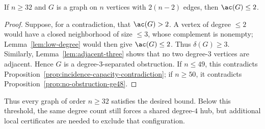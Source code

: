 \begin{theorem}\label{thm:range-ge32}
If \(n\ge32\) and \(G\) is a graph on \(n\) vertices with
\(2(n-2)\) edges, then \(\ac(G)\le2\).
\end{theorem}

\begin{proof}
Suppose, for a contradiction, that \(\ac(G)>2\).  A vertex of degree
\(\le2\) would have a closed neighborhood of size \(\le3\), whose complement
is nonempty; Lemma~\ref{lem:low-degree} would then give \(\ac(G)\le2\).
Thus \(\delta(G)\ge3\).  Similarly, Lemma~\ref{lem:adjacent-three} shows that
no two degree-\(3\) vertices are adjacent.  Hence \(G\) is a
degree-\(3\)-separated obstruction.  If \(n\le49\), this contradicts
Proposition~\ref{prop:incidence-capacity-contradiction}; if \(n\ge50\), it
    contradicts Proposition~\ref{prop:no-obstruction-ge48}.
\end{proof}

Thus every graph of order \(n\ge32\) satisfies the desired bound.  Below this
threshold, the same degree count still forces a shared degree-\(4\) hub, but
additional local certificates are needed to exclude that configuration.
